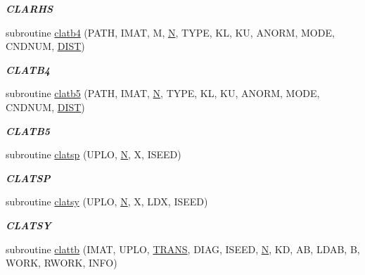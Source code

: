 \begin{DoxyCompactItemize}
\begin{DoxyCompactList}\small\item\em {\bfseries C\+L\+A\+R\+H\+S} \end{DoxyCompactList}\item 
subroutine \hyperlink{group__complex__lin_ga24ce60c916d0d1948c92c6cd574f4304}{clatb4} (P\+A\+T\+H, I\+M\+A\+T, M, \hyperlink{polmisc_8c_a0240ac851181b84ac374872dc5434ee4}{N}, T\+Y\+P\+E, K\+L, K\+U, A\+N\+O\+R\+M, M\+O\+D\+E, C\+N\+D\+N\+U\+M, \hyperlink{superlu__enum__consts_8h_af00a42ecad444bbda75cde1b64bd7e72ac04fbbdf0d80a4ad25e565541deeebd7}{D\+I\+S\+T})
\begin{DoxyCompactList}\small\item\em {\bfseries C\+L\+A\+T\+B4} \end{DoxyCompactList}\item 
subroutine \hyperlink{group__complex__lin_ga945476e3a0d1a67dbc474e56b48710bb}{clatb5} (P\+A\+T\+H, I\+M\+A\+T, \hyperlink{polmisc_8c_a0240ac851181b84ac374872dc5434ee4}{N}, T\+Y\+P\+E, K\+L, K\+U, A\+N\+O\+R\+M, M\+O\+D\+E, C\+N\+D\+N\+U\+M, \hyperlink{superlu__enum__consts_8h_af00a42ecad444bbda75cde1b64bd7e72ac04fbbdf0d80a4ad25e565541deeebd7}{D\+I\+S\+T})
\begin{DoxyCompactList}\small\item\em {\bfseries C\+L\+A\+T\+B5} \end{DoxyCompactList}\item 
subroutine \hyperlink{group__complex__lin_ga11e09919ecf0cb1c756568adcbc33a55}{clatsp} (U\+P\+L\+O, \hyperlink{polmisc_8c_a0240ac851181b84ac374872dc5434ee4}{N}, X, I\+S\+E\+E\+D)
\begin{DoxyCompactList}\small\item\em {\bfseries C\+L\+A\+T\+S\+P} \end{DoxyCompactList}\item 
subroutine \hyperlink{group__complex__lin_gaff37584c2c01f51e536f71fb462bc402}{clatsy} (U\+P\+L\+O, \hyperlink{polmisc_8c_a0240ac851181b84ac374872dc5434ee4}{N}, X, L\+D\+X, I\+S\+E\+E\+D)
\begin{DoxyCompactList}\small\item\em {\bfseries C\+L\+A\+T\+S\+Y} \end{DoxyCompactList}\item 
subroutine \hyperlink{group__complex__lin_ga529f55e1ce77b4bfaea19b95da89c2a2}{clattb} (I\+M\+A\+T, U\+P\+L\+O, \hyperlink{superlu__enum__consts_8h_a0c4e17b2d5cea33f9991ccc6a6678d62a1f61e3015bfe0f0c2c3fda4c5a0cdf58}{T\+R\+A\+N\+S}, D\+I\+A\+G, I\+S\+E\+E\+D, \hyperlink{polmisc_8c_a0240ac851181b84ac374872dc5434ee4}{N}, K\+D, A\+B, L\+D\+A\+B, B, W\+O\+R\+K, R\+W\+O\+R\+K, I\+N\+F\+O)

\end{DoxyCompactItemize}
